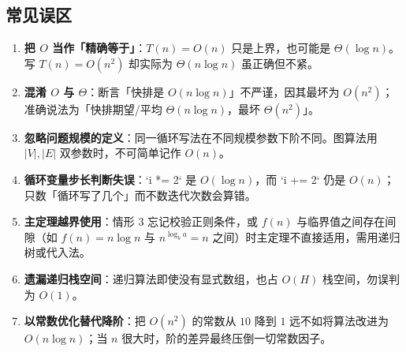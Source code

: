 \subsection{常见误区}

\begin{enumerate}
    \item \textbf{把 $O$ 当作「精确等于」}：$T(n)=O(n)$ 只是上界，也可能是 $\Theta(\log n)$。写 $T(n)=O(n^2)$ 却实际为 $\Theta(n\log n)$ 虽正确但不紧。
    \item \textbf{混淆 $O$ 与 $\Theta$}：断言「快排是 $O(n\log n)$」不严谨，因其最坏为 $O(n^2)$；准确说法为「快排期望/平均 $\Theta(n\log n)$，最坏 $\Theta(n^2)$」。
    \item \textbf{忽略问题规模的定义}：同一循环写法在不同规模参数下阶不同。图算法用 $|V|,|E|$ 双参数时，不可简单记作 $O(n)$。
    \item \textbf{循环变量步长判断失误}：`i *= 2` 是 $O(\log n)$，而 `i += 2` 仍是 $O(n)$；只数「循环写了几个」而不数迭代次数会算错。
    \item \textbf{主定理越界使用}：情形 3 忘记校验正则条件，或 $f(n)$ 与临界值之间存在间隙（如 $f(n)=n\log n$ 与 $n^{\log_b a}=n$ 之间）时主定理不直接适用，需用递归树或代入法。
    \item \textbf{遗漏递归栈空间}：递归算法即使没有显式数组，也占 $O(H)$ 栈空间，勿误判为 $O(1)$。
    \item \textbf{以常数优化替代降阶}：把 $O(n^2)$ 的常数从 $10$ 降到 $1$ 远不如将算法改进为 $O(n\log n)$；当 $n$ 很大时，阶的差异最终压倒一切常数因子。
\end{enumerate}

